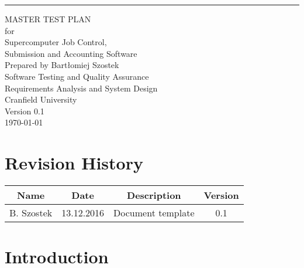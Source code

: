 \documentclass{scrreprt}
\def\myversion{0.1}
\begin{document}
	
\begin{titlepage}
	\begin{flushright}
		\rule{15cm}{5pt}\vskip1cm
		\begin{bfseries}
			\Huge{MASTER TEST PLAN}\\
			\vspace{2cm}
			\Large{for}\\
			\vspace{1.5cm}
			\LARGE{
				Supercomputer Job Control,\\
				Submission and Accounting Software\\
			}
			\vfill
			Prepared by Bartłomiej Szostek\\
			\vspace{2cm}
			\Large{
				Software Testing and Quality Assurance\\
				Requirements Analysis and System Design\\
				Cranfield University\\
			}
			\vfill
			\Large{Version \myversion}\\
			\vfill
			{\large \today}
		\end{bfseries}
	\end{flushright}
\end{titlepage}

\tableofcontents

\chapter*{Revision History}

\begin{center}
    \begin{tabular}{|c|c|c|c|}
        \hline
	    Name & Date & Description & Version\\
        \hline
	    B. Szostek & 13.12.2016 & Document template & 0.1\\
        \hline
    \end{tabular}
\end{center}

\chapter{Introduction}

\em %
\end{document}
